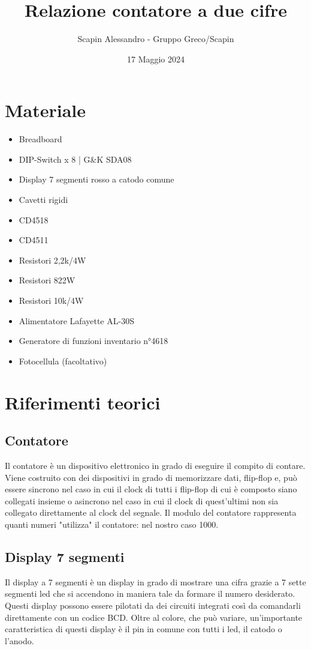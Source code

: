\documentclass[a4paper, 10pt]{RelazioneLab}
\title{Relazione contatore a due cifre}
\author{Scapin Alessandro - Gruppo Greco/Scapin}
\date{17 Maggio 2024}
\begin{document}
\maketitle

\section{Materiale}
\begin{multicols}{2}
    \begin{itemize}
        \item Breadboard
        \item DIP-Switch x 8 | G\&K SDA08
        \item Display 7 segmenti rosso a catodo comune
        \item Cavetti rigidi
        \item CD4518
        \item CD4511
        \item Resistori 2,2k\ohm {}/4W
        \item Resistori 82\ohm \space 2W
        \item Resistori 10k\ohm {}/4W
        \item Alimentatore Lafayette AL-30S
        \item Generatore di funzioni inventario n°4618
        \item Fotocellula (facoltativo)
    \end{itemize}
\end{multicols}
\section{Riferimenti teorici}
\subsection{Contatore}
Il contatore è un dispositivo elettronico in grado di eseguire il compito di contare. Viene costruito con dei dispositivi in grado di memorizzare dati, flip-flop e, può essere sincrono nel caso in cui il clock di tutti i flip-flop di cui è composto siano collegati insieme o asincrono nel caso in cui il clock di quest'ultimi non sia collegato direttamente al clock del segnale. Il modulo del contatore rappresenta quanti numeri "utilizza" il contatore: nel nostro caso 1000.
\subsection{Display 7 segmenti}
Il display a 7 segmenti è un display in grado di mostrare una cifra grazie a 7 sette segmenti led che si accendono in maniera tale da formare il numero desiderato. Questi display possono essere pilotati da dei circuiti integrati così da comandarli direttamente con un codice BCD. Oltre al colore, che può variare, un'importante caratteristica di questi display è il pin in comune con tutti i led, il catodo o l'anodo.
\end{document}
